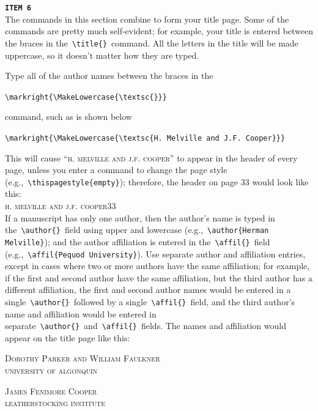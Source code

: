 \documentclass[titlepage,12pt]{article}
\begin{document}
\noindent\texttt{\bf ITEM 6}\\[1.5ex]

The commands in this section combine to form your title page. Some
of the commands are pretty much self-evident; for example, your
title is entered between the braces in
the~\verb=\title{}=~command. All the letters in the title will be
made uppercase, so it doesn't matter how they are typed.

Type all of the author names between the braces in
the

\begin{center}\verb=\markright{\MakeLowercase{\textsc{}}}=\end{center}

\noindent command, such as is shown below

\begin{center}\verb=\markright{\MakeLowercase{\textsc{H. Melville and J.F. Cooper}}}=\end{center}

\noindent This will cause ``\MakeLowercase{\textsc{H. Melville and
J.F. Cooper}}'' to appear in the header of every page, unless you
enter a command to change the page style
(e.g.,~\verb=\thispagestyle{empty}=);
therefore, the header on page 33 would look like this:\\[1.5ex]

\noindent \MakeLowercase{\textsc{H. Melville and J.F. Cooper}}\hspace{\fill}33\\[1.5ex]

If a manuscript has only one author, then the author's name is
typed in the~\verb=\author{}=~field using upper and lowercase
(e.g.,~\verb=\author{Herman Melville}=); and the author
affiliation is entered in the~\verb=\affil{}=~field
(e.g.,~\verb=\affil{Pequod University}=). Use separate author and
affiliation entries, except in cases where two or more authors
have the same affiliation; for example, if the first and second
author have the same affiliation, but the third author has a
different affiliation, the first and second author names would be
entered in a single~\verb=\author{}=~followed by a
single~\verb=\affil{}=~field, and the third author's name and
affiliation would be entered in
separate~\verb=\author{}=~and~\verb=\affil{}=~fields. The names
and affiliation would appear on the title page like this:

\begin{center}
\textsc{Dorothy Parker and William Faulkner}\\

\MakeLowercase{\textsc{University of Algonquin}}\\

\vskip6pt

\textsc{James Fenimore Cooper}\\

\MakeLowercase{\textsc{Leatherstocking Institute}}\\

\end{center}
\end{document}
